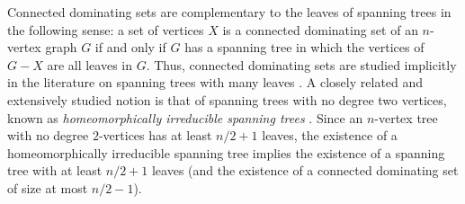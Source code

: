 \documentclass[11pt]{article}
\newcommand{\pat}[1]{\textcolor{red}{PM: #1}}
\theoremstyle{definition}
\newcommand{\vida}[1]{[{\color{pink}VD: #1}]}
\begin{document}
Connected dominating sets are complementary to the leaves of spanning trees in the following sense: a set of vertices $X$ is a connected dominating set of an $n$-vertex  graph $G$ if and only if $G$ has a spanning tree in which the vertices of $G-X$ are all leaves in $G$. Thus, connected dominating sets are studied implicitly in the literature on spanning trees with many leaves \citep{DBLP:journals/jgt/DingJS01, kleitman.west:spanning, doi:10.1137/100801251,doi:10.1137/060664318, DBLP:conf/esa/BousquetI0MOSW20, noguchi.zamfirescu:spanning}. A closely related and extensively studied notion is that of spanning trees with no degree two vertices, known as \emph{homeomorphically irreducible spanning trees} \citep{chen.ren.ea:homeomorphically,albertson.berman.ea:graphs,CHEN2013409, DBLP:journals/jgt/ItoT22, DBLP:journals/jgt/Hoffmann-Ostenhof18a, gessel2023good}.  Since an $n$-vertex tree with no degree $2$-vertices has at least $n/2+1$ leaves, the existence of a homeomorphically irreducible spanning tree implies the existence of a spanning tree with at least $n/2+1$ leaves (and the existence of a connected dominating set of size at most $n/2-1$). %





\end{document}
